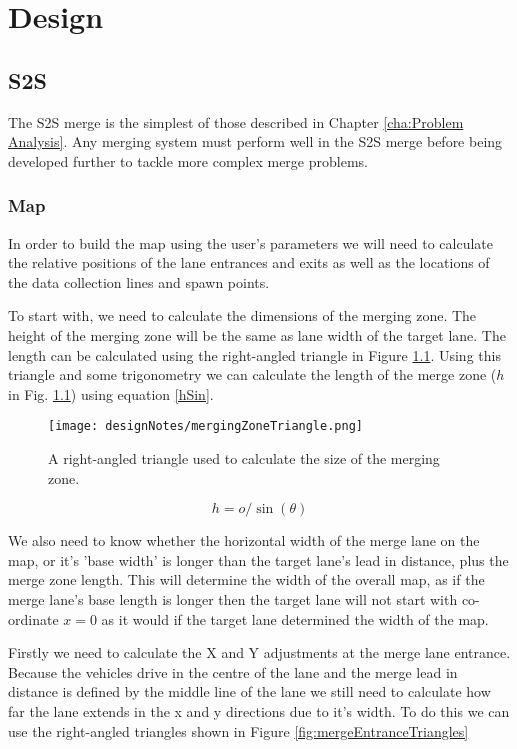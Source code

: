 \chapter{Design}
\label{cha:Design}

\section{S2S}{}
\label{sec:S2S}
The S2S merge is the simplest of those described in Chapter \ref{cha:Problem Analysis}. Any merging system must perform well in the S2S merge before being developed further to tackle more complex merge problems.

\subsection{Map}
\label{subsec:Map}
In order to build the map using the user's parameters we will need to calculate the relative positions of the lane entrances and exits as well as the locations of the data collection lines and spawn points.

To start with, we need to calculate the dimensions of the merging zone. The height of the merging zone will be the same as lane width of the target lane. The length can be calculated using the right-angled triangle in Figure \ref{fig:mergingZoneTriangle}. Using this triangle and some trigonometry we can calculate the length of the merge zone ($h$ in Fig. \ref{fig:mergingZoneTriangle}) using equation \ref{hSin}.

\begin{figure}[htb]
\texttt{[image: designNotes/mergingZoneTriangle.png]}
\caption{A right-angled triangle used to calculate the size of the merging zone.}
\label{fig:mergingZoneTriangle}
\end{figure}

\begin{equation}\label{hSin}
h = o / \sin(\theta)
\end{equation}

We also need to know whether the horizontal width of the merge lane on the map, or it's 'base width' is longer than the target lane's lead in distance, plus the merge zone length. This will determine the width of the overall map, as if the merge lane's base length is longer then the target lane will not start with co-ordinate $x=0$ as it would if the target lane determined the width of the map.

Firstly we need to calculate the X and Y adjustments at the merge lane entrance. Because the vehicles drive in the centre of the lane and the merge lead in distance is defined by the middle line of the lane we still need to calculate how far the lane extends in the x and y directions due to it's width. To do this we can use the right-angled triangles shown in Figure \ref{fig:mergeEntranceTriangles}

